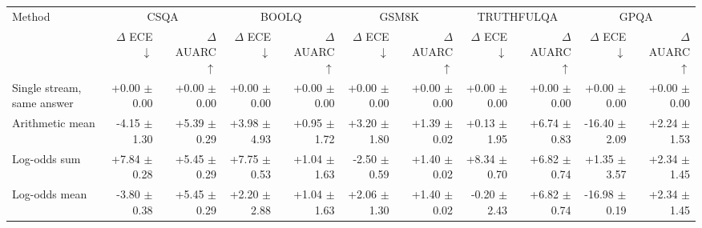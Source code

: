 \begin{tabular}{lrrrrrrrrrr}
\toprule
Method & \multicolumn{2}{c}{CSQA} & \multicolumn{2}{c}{BOOLQ} & \multicolumn{2}{c}{GSM8K} & \multicolumn{2}{c}{TRUTHFULQA} & \multicolumn{2}{c}{GPQA} \\
 & $\Delta$ ECE $\downarrow$ & $\Delta$ AUARC $\uparrow$ & $\Delta$ ECE $\downarrow$ & $\Delta$ AUARC $\uparrow$ & $\Delta$ ECE $\downarrow$ & $\Delta$ AUARC $\uparrow$ & $\Delta$ ECE $\downarrow$ & $\Delta$ AUARC $\uparrow$ & $\Delta$ ECE $\downarrow$ & $\Delta$ AUARC $\uparrow$ \\
\midrule
Single stream, same answer & +0.00 {\scriptsize $\pm$ 0.00} & +0.00 {\scriptsize $\pm$ 0.00} & +0.00 {\scriptsize $\pm$ 0.00} & +0.00 {\scriptsize $\pm$ 0.00} & +0.00 {\scriptsize $\pm$ 0.00} & +0.00 {\scriptsize $\pm$ 0.00} & +0.00 {\scriptsize $\pm$ 0.00} & +0.00 {\scriptsize $\pm$ 0.00} & +0.00 {\scriptsize $\pm$ 0.00} & +0.00 {\scriptsize $\pm$ 0.00} \\
Arithmetic mean & -4.15 {\scriptsize $\pm$ 1.30} & +5.39 {\scriptsize $\pm$ 0.29} & +3.98 {\scriptsize $\pm$ 4.93} & +0.95 {\scriptsize $\pm$ 1.72} & +3.20 {\scriptsize $\pm$ 1.80} & +1.39 {\scriptsize $\pm$ 0.02} & +0.13 {\scriptsize $\pm$ 1.95} & +6.74 {\scriptsize $\pm$ 0.83} & -16.40 {\scriptsize $\pm$ 2.09} & +2.24 {\scriptsize $\pm$ 1.53} \\
Log-odds sum & +7.84 {\scriptsize $\pm$ 0.28} & +5.45 {\scriptsize $\pm$ 0.29} & +7.75 {\scriptsize $\pm$ 0.53} & +1.04 {\scriptsize $\pm$ 1.63} & -2.50 {\scriptsize $\pm$ 0.59} & +1.40 {\scriptsize $\pm$ 0.02} & +8.34 {\scriptsize $\pm$ 0.70} & +6.82 {\scriptsize $\pm$ 0.74} & +1.35 {\scriptsize $\pm$ 3.57} & +2.34 {\scriptsize $\pm$ 1.45} \\
Log-odds mean & -3.80 {\scriptsize $\pm$ 0.38} & +5.45 {\scriptsize $\pm$ 0.29} & +2.20 {\scriptsize $\pm$ 2.88} & +1.04 {\scriptsize $\pm$ 1.63} & +2.06 {\scriptsize $\pm$ 1.30} & +1.40 {\scriptsize $\pm$ 0.02} & -0.20 {\scriptsize $\pm$ 2.43} & +6.82 {\scriptsize $\pm$ 0.74} & -16.98 {\scriptsize $\pm$ 0.19} & +2.34 {\scriptsize $\pm$ 1.45} \\

\end{tabular}
